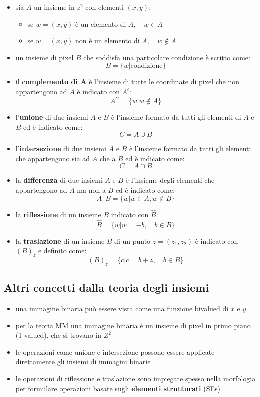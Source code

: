\begin{itemize}
	\item sia $A$ un insieme in $z^2$ con elementi $(x, y)$:
	\begin{itemize}
		\item se $w = (x, y)$ è un elemento di $A, \quad w \in A$
		\item se $w = (x, y)$ non è un elemento di $A, \quad w \notin A$
	\end{itemize}
	
	\item un insieme di pixel $B$ che soddisfa una particolare condizione è scritto come:
	$$
	B = \{w | \text{condizione}\}
	$$
	
	\item il \textbf{complemento di A} è l'insieme di tutte le coordinate di pixel che non appartengono ad $A$ è indicato con $A^c$:
	$$
	A^C = \{w | w \notin A \}
	$$
	
	\item l'\textbf{unione} di due insiemi $A$ e $B$ è l'insieme formato da tutti gli elementi di $A$ e $B$ ed è indicato come:
	$$
	C = A \cup B
	$$
	
	\item l'\textbf{intersezione} di due insiemi $A$ e $B$ è l'insieme formato da tutti gli elementi che appartengono sia ad $A$ che a $B$ ed è indicato come:
	$$
	C = A \cap B
	$$
	
	\item la \textbf{differenza} di due insiemi $A$ e $B$ è l'insieme degli elementi che appartengono ad $A$ ma non a $B$ ed è indicato come:
	$$
	A – B = \{w | w \in A, w \notin B\}
	$$
	
	\item la \textbf{riflessione} di un insieme $B$ indicato con $\hat B$:
	$$
	\hat B = \{w | w = -b, \quad b \in B\}
	$$
	
	\item la \textbf{traslazione} di un insieme $B$ di un punto $z =(z_1, z_2)$ è indicato con $(B)_z$ e definito come:
	$$
	(B)_z = \{c|c= b + z, \quad b \in B \}
	$$
\end{itemize}

\subsection{Altri concetti dalla teoria degli insiemi}
\begin{itemize}
	\item una immagine binaria può essere vista come una funzione bivalued di $x$ e $y$
	
	\item per la teoria MM una immagine binaria è un insieme di pixel in primo piano (1-valued), che si trovano in $Z^2$
	
	\item le operazioni come unione e intersezione possono essere applicate direttamente gli insiemi di immagini binarie
	
	\item le operazioni di riflessione e traslazione sono impiegate spesso nella morfologia per formulare operazioni basate sugli \textbf{elementi strutturati} (SEs)
\end{itemize}


